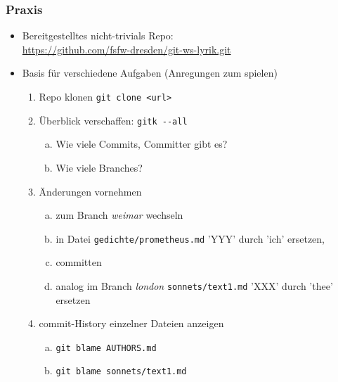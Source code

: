 \documentclass{beamer}
\begin{document}
\begin{frame}[fragile,label=uebung10]
\frametitle{Praxis}
\begin{itemize}
 \item Bereitgestelltes nicht-trivials Repo:\\
 {\scriptsize \url{https://github.com/fsfw-dresden/git-ws-lyrik.git}}
 \item Basis für verschiedene Aufgaben (Anregungen zum spielen)
\begin{enumerate}
 \item Repo klonen \verb|git clone <url>|
 \item Überblick verschaffen: \verb|gitk --all|
 \begin{enumerate}[a)]
  \item Wie viele Commits, Committer gibt es?
  \item Wie viele Branches?
 \end{enumerate}
 \item Änderungen vornehmen
 \begin{enumerate}[a)]
 \item zum Branch \textit{weimar} wechseln
 \item in Datei \verb|gedichte/prometheus.md| 'YYY' durch 'ich' ersetzen,
 \item committen
 \item analog im Branch \textit{london} \verb|sonnets/text1.md| 'XXX' durch 'thee' ersetzen
 \end{enumerate}
 \item commit-History einzelner Dateien anzeigen
 \begin{enumerate}[a)]
  \item \verb|git blame AUTHORS.md|
  \item \verb|git blame sonnets/text1.md|
 \end{enumerate}
\setcounter{taskcounter}{\value{enumi}}
\end{enumerate}

\end{itemize}

\end{frame}


\end{document}
